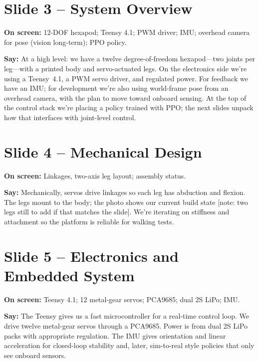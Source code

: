 \documentclass[11pt]{article}
\begin{document}
\section{Slide 3 -- System Overview}
\textbf{On screen:} 12-DOF hexapod; Teensy 4.1; PWM driver; IMU; overhead camera for pose (vision long-term); PPO policy.

\textbf{Say:}
At a high level: we have a twelve degree-of-freedom hexapod---two joints per leg---with a printed body and servo-actuated legs. On the electronics side we're using a Teensy~4.1, a PWM servo driver, and regulated power. For feedback we have an IMU; for development we're also using world-frame pose from an overhead camera, with the plan to move toward onboard sensing. At the top of the control stack we're placing a policy trained with PPO; the next slides unpack how that interfaces with joint-level control.

\section{Slide 4 -- Mechanical Design}
\textbf{On screen:} Linkages, two-axis leg layout; assembly status.

\textbf{Say:}
Mechanically, servos drive linkages so each leg has abduction and flexion. The legs mount to the body; the photo shows our current build state [note: two legs still to add if that matches the slide]. We're iterating on stiffness and attachment so the platform is reliable for walking tests.

\section{Slide 5 -- Electronics and Embedded System}
\textbf{On screen:} Teensy 4.1; 12 metal-gear servos; PCA9685; dual 2S LiPo; IMU.

\textbf{Say:}
The Teensy gives us a fast microcontroller for a real-time control loop. We drive twelve metal-gear servos through a PCA9685. Power is from dual 2S LiPo packs with appropriate regulation. The IMU gives orientation and linear acceleration for closed-loop stability and, later, sim-to-real style policies that only see onboard sensors.

\end{document}
